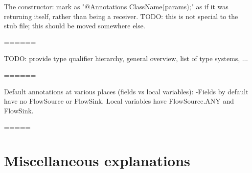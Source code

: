 The constructor:
	mark as "@Annotations ClassName(params);" as if it was returning itself, rather than being a receiver.
TODO: this is not special to the stub file; this should be moved
	somewhere else.

======

TODO: provide type qualifier hierarchy, general overview, list of type
systems, ...

======

Default annotations at various places (fields vs local variables):
-Fields by default have no FlowSource or FlowSink. Local variables have FlowSource.ANY and FlowSink{}.


=====

\section{Miscellaneous explanations}

